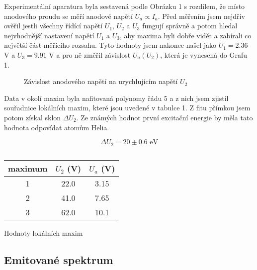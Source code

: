 \documentclass[a4paper,11pt]{article}
\begin{document}
Experimentální aparatura byla sestavená podle Obrázku 1 s rozdílem, že místo anodového proudu se měří anodové napětí $ U_a \propto I_a $. Před měřením jsem nejdřív ověřil jestli všechny řídící napětí $ U_1 $, $ U_2 $ a $ U_3 $ fungují správně a potom hledal nejvhodnější nastavení napětí $ U_1 $ a $ U_3 $, aby maxima byli dobře vidět a zabírali co největší část měřícího rozsahu. Tyto hodnoty jsem nakonec našel jako $ U_1 = 2.36 $ V a $ U_3 = 9.91 $ V a pro ně změřil závislost $ U_a(U_2) $, která je vynesená do Grafu 1. 


\begin{figure}[htpb]
    \centering
    
    \captionsetup{type=graph}
    \caption{Závislost anodového napětí na urychlujícím napětí $ U_2 $ }
\end{figure}

Data v okolí maxim byla nafitovaná polynomy řádu 5 a z nich jsem zjistil souřadnice lokálních maxim, které jsou uvedené v tabulce 1. Z fitu přímkou jsem potom získal sklon $ \Delta U_2 $. Ze známých hodnot první excitační energie by měla tato hodnota odpovídat atomům Helia. 

\begin{equation}
\Delta U_2 = 20 \pm 0.6 \text{ eV}
\end{equation}


\begin{table}[htpb]
    \begin{minipage}{.4\linewidth}
        \centering
        \begin{tabular}{| c c c |}
            \hline
            maximum & $ U_2 $ (V) & $ U_a $ (V)  \\
            \hline
            1 & 22.0 & 3.15 \\
            2 & 41.0 & 7.65 \\
            3 & 62.0 & 10.1 \\
            \hline
        \end{tabular}
        \caption{Hodnoty lokálních maxim}
    \end{minipage} 
    \hfill
    \begin{minipage}{.55\linewidth}
        \centering
        \resizebox{\textwidth}{!}{  }
        \caption{}
    \end{minipage} 
\end{table}

\subsection{Emitované spektrum}
\end{document}
